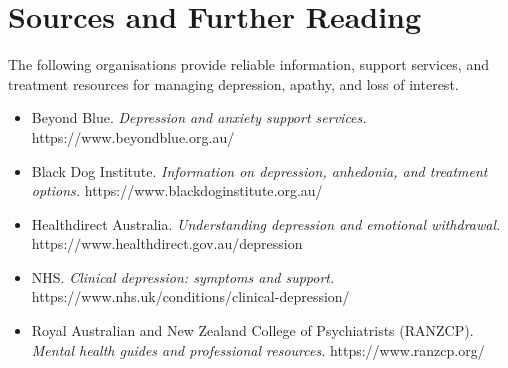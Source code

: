 \section*{Sources and Further Reading}
The following organisations provide reliable information, support services, and treatment resources for managing depression, apathy, and loss of interest.
\begin{itemize}
    \item Beyond Blue. \textit{Depression and anxiety support services.} https://www.beyondblue.org.au/
    \item Black Dog Institute. \textit{Information on depression, anhedonia, and treatment options.} https://www.blackdoginstitute.org.au/
    \item Healthdirect Australia. \textit{Understanding depression and emotional withdrawal.} https://www.healthdirect.gov.au/depression
    \item NHS. \textit{Clinical depression: symptoms and support.} https://www.nhs.uk/conditions/clinical-depression/
    \item Royal Australian and New Zealand College of Psychiatrists (RANZCP). \textit{Mental health guides and professional resources.} https://www.ranzcp.org/
\end{itemize}
